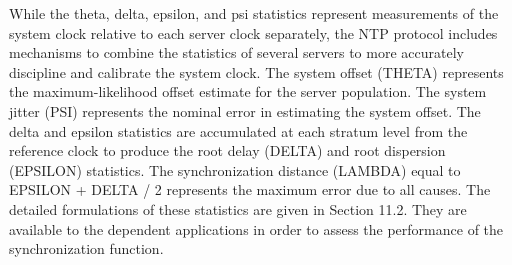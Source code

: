 While the theta, delta, epsilon, and psi statistics represent
measurements of the system clock relative to each server clock
separately, the NTP protocol includes mechanisms to combine the
statistics of several servers to more accurately discipline and
calibrate the system clock. The system offset (THETA) represents the
maximum-likelihood offset estimate for the server population. The
system jitter (PSI) represents the nominal error in estimating the
system offset. The delta and epsilon statistics are accumulated at
each stratum level from the reference clock to produce the root delay
(DELTA) and root dispersion (EPSILON) statistics. The
synchronization distance (LAMBDA) equal to EPSILON + DELTA / 2
represents the maximum error due to all causes. The detailed
formulations of these statistics are given in Section 11.2. They are
available to the dependent applications in order to assess the
performance of the synchronization function.
